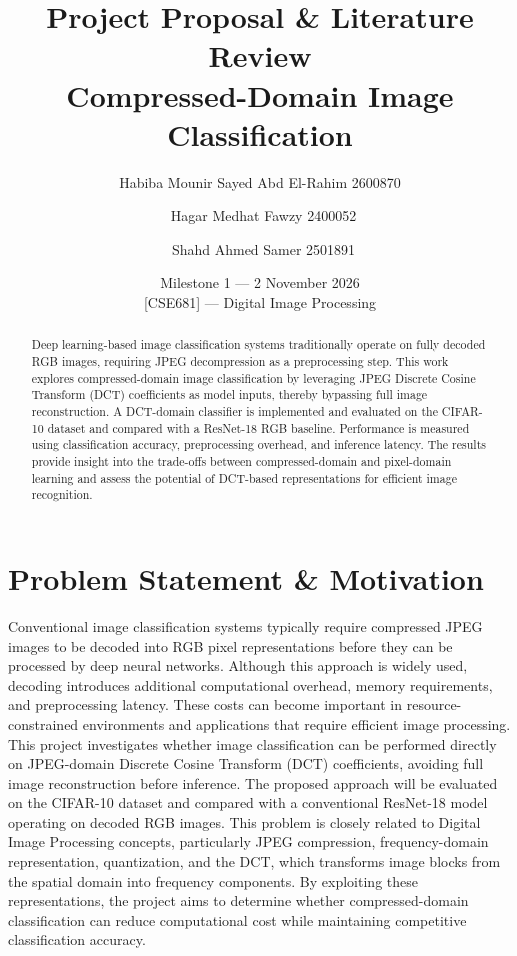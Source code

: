 \documentclass[11pt]{article}
\title{\LARGE Project Proposal \& Literature Review \\[4pt]
\large Compressed-Domain Image Classification}
\author{
  Habiba Mounir Sayed Abd El-Rahim 2600870\and
  \ Hagar Medhat Fawzy 2400052\and
  \ Shahd Ahmed Samer 2501891
}
\date{Milestone 1 --- 2 November 2026 \\{} [CSE681] --- Digital Image Processing}
\begin{document}
\maketitle

\begin{abstract}
Deep learning-based image classification systems traditionally operate on fully decoded RGB images, requiring JPEG decompression as a preprocessing step. This work explores compressed-domain image classification by leveraging JPEG Discrete Cosine Transform (DCT) coefficients as model inputs, thereby bypassing full image reconstruction. A DCT-domain classifier is implemented and evaluated on the CIFAR-10 dataset and compared with a ResNet-18 RGB baseline. Performance is measured using classification accuracy, preprocessing overhead, and inference latency. The results provide insight into the trade-offs between compressed-domain and pixel-domain learning and assess the potential of DCT-based representations for efficient image recognition.
\end{abstract}

\section{Problem Statement \& Motivation}
\label{sec:motivation}

Conventional image classification systems typically require compressed
JPEG images to be decoded into RGB pixel representations before they can
be processed by deep neural networks. Although this approach is widely
used, decoding introduces additional computational overhead, memory
requirements, and preprocessing latency. These costs can become important
in resource-constrained environments and applications that require
efficient image processing. This project investigates whether image
classification can be performed directly on JPEG-domain Discrete Cosine
Transform (DCT) coefficients, avoiding full image reconstruction before
inference. The proposed approach will be evaluated on the CIFAR-10 dataset
and compared with a conventional ResNet-18 model operating on decoded RGB
images. This problem is closely related to Digital Image Processing
concepts, particularly JPEG compression, frequency-domain representation,
quantization, and the DCT, which transforms image blocks from the spatial
domain into frequency components. By exploiting these representations,
the project aims to determine whether compressed-domain classification can
reduce computational cost while maintaining competitive classification
accuracy.
\end{document}
